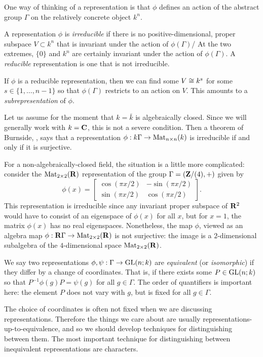 \documentclass[11pt, oneside, usenames, dvipsnames, svgnames, table, draft]{amsart}
\begin{document}
One way of thinking of a representation is that $\phi$ defines an action of the abstract group $\Gamma$ on the
relatively concrete object $k^n$.

A representation $\phi$ is \emph{irreducible} if there is no positive-dimensional, proper subspace $V \subset k^n$ that
is invariant under the action of $\phi(\Gamma)$/ At the two extremes, $\{0\}$ and $k^n$ are certainly invariant under
the action of $\phi(\Gamma)$. A \emph{reducible} representation is one that is not irreducible.

If $\phi$ is a reducible representation, then we can find some $V \cong k^s$ for some $s \in \{1, \dots, n-1\}$ so that
$\phi(\Gamma)$ restricts to an action on $V$. This amounts to a \emph{subrepresentation} of $\phi$.

\begin{remark}
Let us assume for the moment that $k = \bar k$ is algebraically closed. Since we will generally work with $k = \mathbf{C}$,
this is not a severe condition. Then a theorem of Burnside, \cite{Lomonosov2004}, says that a
representation $\phi : k \Gamma \to \operatorname{Mat}_{n \times n}(k)$ is irreducible if and only if it is surjective.

For a non-algebraically-closed field, the situation is a little more complicated: consider the $\operatorname{Mat}_{2\times 2}(\mathbf{R})$ representation of the
group $\Gamma=(\mathbf{Z}/(4), +)$ given by \[ \phi(x) =
\begin{bmatrix}
  \cos(\pi x/2) & -\sin(\pi x/2) \\ \sin(\pi x/2) & \cos(\pi x/2)
\end{bmatrix}.\] This representation is irreducible since any invariant proper subspace of $\mathbf{R}^2$ would have to consist
of an eigenspace of $\phi(x)$ for all $x$, but for $x=1$, the matrix $\phi(x)$ has no real eigenspaces. Nonetheless,
the map $\phi$, viewed as an algebra map $\phi : \mathbf{R} \Gamma \to \operatorname{Mat}_{2 \times 2}(\mathbf{R})$ is not surjective: the image
is a $2$-dimensional subalgebra of the $4$-dimensional space $\operatorname{Mat}_{2 \times 2}(\mathbf{R})$.
\end{remark}

We say two representations $\phi, \psi : \Gamma \to \operatorname{GL}(n;k)$ are \emph{equivalent} (or \emph{isomorphic}) if they
differ by a change of coordinates. That is, if there exists some $P \in \operatorname{GL}(n; k)$ so that $P^{-1} \phi(g) P = \psi(g)$
for all $g \in \Gamma$. The order of quantifiers is important here: the element $P$ does not vary with $g$, but is fixed
for all $g \in \Gamma$.

The choice of coordinates is often not fixed when we are discussing representations. Therefore the things we care about
are usually representations-up-to-equivalence, and so we should develop techniques for distinguishing between them. The
most important technique for distinguishing between inequivalent representations are characters.
\end{document}
